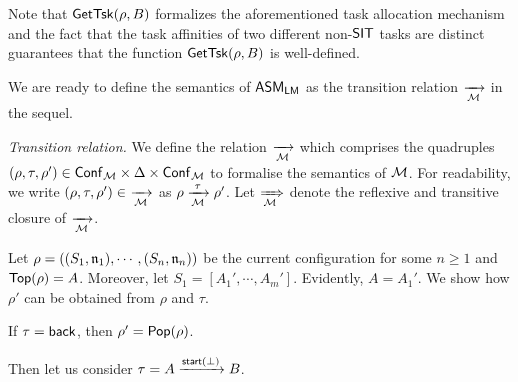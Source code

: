 Note that $\mathsf{GetTsk}(\rho, B)$ formalizes the aforementioned task allocation mechanism and the fact that the task affinities of two different non-$\mathsf{SIT}$ tasks are distinct guarantees that the function $\mathsf{GetTsk}(\rho, B)$ is well-defined. 

We are ready to define the semantics of $\textsf{ASM}_\textsf{LM}$ as the transition relation $\xrightarrow[{\mathcal{M} }]{}$ in the sequel. 

\emph{Transition relation.} We define the relation $\xrightarrow[{\mathcal{M} }]{}$ which comprises the quadruples $(\rho, \tau, \rho') \in {\mathsf{Conf} }_{\mathcal{M} } \times \Delta  \times {\mathsf{Conf} }_{\mathcal{M} }$ to formalise the semantics of ${\mathcal{M} }$. For readability, we write $(\rho, \tau, \rho')\in\ \xrightarrow[{\mathcal{M} }]{}$  as $\rho \xrightarrow[{\mathcal{M} }]{\tau} \rho'$. 
Let $\xRightarrow[{\mathcal{M} }]{}$ denote the reflexive and transitive closure of $\xrightarrow[{\mathcal{M} }]{}$.

Let $\rho = ((S_1,\mathfrak{n}_1),\cdots,(S_n,\mathfrak{n}_n))$ be the current configuration for some $n \ge 1$ and $\mathsf{Top}(\rho) = A$. Moreover, let $S_1 = [A_1',\cdots,A_m']$. Evidently, $A = A_1'$. We show how $\rho'$ can be obtained from $\rho$ and $\tau$.

If $\tau = {\mathsf{back} }$, then $\rho' = \mathsf{Pop}(\rho)$. 

Then let us consider $\tau = A\xrightarrow{{\mathsf{start} }(\bot)}B$.










